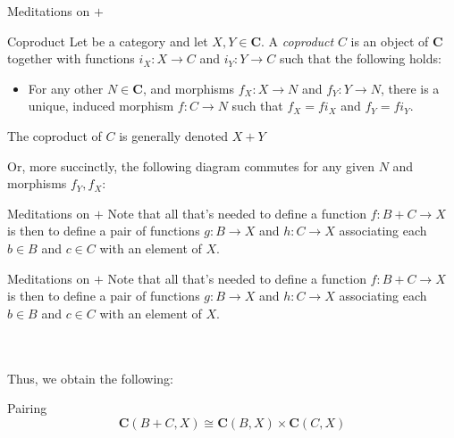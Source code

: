 \documentclass[tikz]{beamer}
\theoremstyle{definition}
\begin{document}
\begin{frame}{Meditations on $+$}
    \begin{definition}{Coproduct}
        Let  be a category and let $X, Y \in \mathbf{C}$. A \textit{coproduct} $C$ is an object of $\mathbf{C}$ together with functions $i_X : X \to C$ and $i_Y: Y \to C$ such that the following holds: 
        
        \begin{itemize}
            \item For any other $N \in \mathbf{C}$, and morphisms $f_X: X \to N$ and $f_Y: Y \to N$, there is a unique, induced morphism $f: C \to N$ such that $f_X = fi_X$ and $f_Y = fi_Y$.
        \end{itemize}{}
    \end{definition}{}
    
    The coproduct of $C$ is generally denoted $X + Y$
\end{frame}{}

\begin{frame}[fragile]
    Or, more succinctly, the following diagram commutes for any given $N$ and morphisms $f_Y, f_X$: 
    
\begin{center}
    {}
\end{center}{}

\end{frame}

\begin{frame}{Meditations on $+$}
    Note that all that's needed to define a function $f: B + C \to X$ is then to define a pair of functions $g: B \to X$ and $h: C \to X$ associating each $b \in B$ and $c \in C$ with an element of $X$. 

\end{frame}

\begin{frame}{Meditations on $+$}
    Note that all that's needed to define a function $f: B + C \to X$ is then to define a pair of functions $g: B \to X$ and $h: C \to X$ associating each $b \in B$ and $c \in C$ with an element of $X$. 

\\
\\
Thus, we obtain the following: 

\begin{block}{Pairing}
    \begin{equation*}
        \mathbf{C}(B + C, X) \cong \mathbf{C}(B, X) \times \mathbf{C}(C, X)
    \end{equation*}{}
\end{block}{}
\end{frame}
\end{document}
